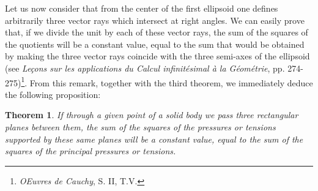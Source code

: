 \documentclass[leqno,openright,smallroyalvopaper,8pt,twoside,showtrims]{memoir}
\newtheorem{thm}{Theorem}
\begin{document}
Let us now consider that from the center of the first ellipsoid one defines arbitrarily three vector rays which intersect at right angles. We can easily prove that, if we divide the unit by each of these vector rays, the sum of the squares of the quotients will be a constant value, equal to the sum that would be obtained by making the three vector rays coincide with the three semi-axes of the ellipsoid (see \emph{Le\c{c}ons sur les applications du Calcul infinit\'esimal \`a la G\'eom\'etrie}, pp. 274-275)\footnote{\emph{OEuvres de Cauchy}, S. II, T.V.}. From this remark, together with the third theorem, we immediately deduce the following proposition:
\begin{thm}
If through a given point of a solid body we pass three rectangular planes between them, the sum of the squares of the pressures or tensions supported by these same planes will be a constant value, equal to the sum of the squares of the principal pressures or tensions.
\end{thm}
\end{document}
